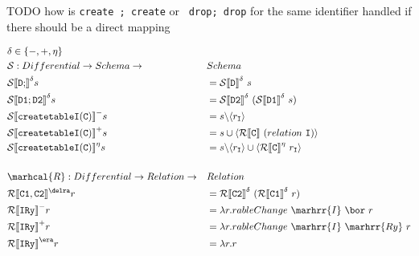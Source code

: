 \documentclass[12pt]{article}
\newcommand{\cmp}[2]{
  \mathcal{#1}|[\mathtt{#2}|]
}
\begin{document}
TODO how is \verb|create ; create| or \verb| drop; drop| for the same identifier handled if there should be a direct mapping

\begin{alignat*}{2}
  &\delta \in \{-, +, \eta \} &&\\
  &\mathcal{S} : Differential -> Schema -> &&Schema \\
  &\cmp{S}{D;}^{\delta}s &&= \cmp{S}{D}^{\delta}\ s \\
  &\cmp{S}{D1;D2}^{\delta}s &&= \cmp{S}{D2}^{\delta}\ (\cmp{S}{D1}^{\delta}\ s) \\
  &\cmp{S}{create table I ( C )}^{-}s &&= s \backslash \langle r_{\mathtt{I}}\rangle \\
  &\cmp{S}{create table I ( C )}^{+}s &&= s \cup \langle \cmp{R}{C}\ (relation\ \mathtt{I})\rangle \\
  &\cmp{S}{create table I ( C )}^{\eta}s &&= s \backslash \langle r_{\mathtt{I}}\rangle \cup \langle \cmp{R}{C}^{\eta}\ r_{\mathtt{I}}\rangle \\
  \\
  &\marhcal{R} : Differential -> Relation -> && Relation \\
  &\cmp{R}{C1, C2}{}^{\delra}r &&= \cmp{R}{C2}^{\delta}\ (\cmp{R}{C1}^{\delta}\ r) \\
  &\cmp{R}{I Ry}^{-}r &&= \lambda r.rableChange\ \marhrr{I}\ \bor\ r \\
  &\cmp{R}{I Ry}^{+}r &&= \lambda r.rableChange\ \marhrr{I}\ \marhrr{Ry}\ r \\
  &\cmp{R}{I Ry}^{\era}r &&= \lambda r. r \\
\end{alignat*}



\end{document}
